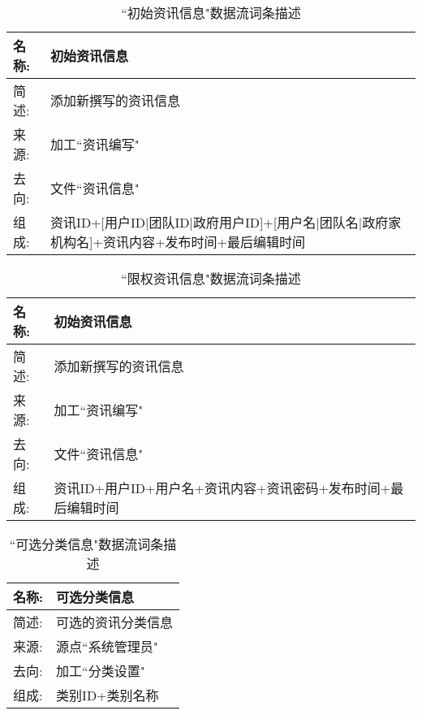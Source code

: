 \begin{table}[H]  
\caption{``初始资讯信息"数据流词条描述}  
\begin{center}  
    \begin{tabular}{l p{11cm}} 
        \hline
        \quad 名称:  &  初始资讯信息 \\
        \hline
        \quad 简述:  & 添加新撰写的资讯信息 \\
        \hline
        \quad 来源:  & 加工``资讯编写" \\
        \hline
        \quad 去向:  & 文件``资讯信息" \\
        \hline
        \quad 组成:  & 资讯ID+[用户ID|团队ID|政府用户ID]+[用户名|团队名|政府家机构名]+资讯内容+发布时间+最后编辑时间 \\
        \hline
    \end{tabular}
    \label{tab1}
\end{center}
\end{table}

\begin{table}[H]  
\caption{``限权资讯信息"数据流词条描述}  
\begin{center}  
    \begin{tabular}{l p{11cm}} 
        \hline
        \quad 名称:  &  初始资讯信息 \\
        \hline
        \quad 简述:  & 添加新撰写的资讯信息 \\
        \hline
        \quad 来源:  & 加工``资讯编写" \\
        \hline
        \quad 去向:  & 文件``资讯信息" \\
        \hline
        \quad 组成:  & 资讯ID+用户ID+用户名+资讯内容+{资讯密码}+发布时间+最后编辑时间 \\
        \hline
    \end{tabular}
    \label{tab1}
\end{center}
\end{table}

\begin{table}[H]  
\caption{``可选分类信息"数据流词条描述}  
\begin{center}  
    \begin{tabular}{l p{11cm}} 
        \hline
        \quad 名称:  &  可选分类信息 \\
        \hline
        \quad 简述:  & 可选的资讯分类信息 \\
        \hline
        \quad 来源:  & 源点``系统管理员" \\
        \hline
        \quad 去向:  & 加工``分类设置" \\
        \hline
        \quad 组成:  & 类别ID+类别名称 \\
        \hline
    \end{tabular}
    \label{tab1}
\end{center}
\end{table}

